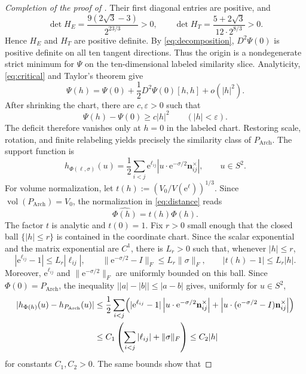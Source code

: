 \documentclass[11pt]{article}
\newcommand{\vol}{\operatorname{vol}}
\newcommand{\Arch}{P_{\mathrm{Arch}}}
\newcommand{\mb}[1]{\mathbf{#1}}
\newcommand{\e}{\mathrm e}
\theoremstyle{remark}
\begin{document}
\begin{proof}[Completion of the proof of ]
Their first diagonal entries are positive, and
\[
 \det H_E=\frac{9(2\sqrt3-3)}{2^{23/3}}>0,\qquad
 \det H_T=\frac{5+2\sqrt3}{12\cdot 2^{8/3}}>0.
\]
Hence $H_E$ and $H_T$ are positive definite.  By \eqref{eq:decomposition},
$D^2\Psi(0)$ is positive definite on all ten tangent directions.  Thus the
origin is a nondegenerate strict minimum for $\Psi$ on the ten-dimensional labeled
similarity slice.
Analyticity, \eqref{eq:critical} and Taylor's theorem give
\[
 \Psi(h)=\Psi(0)+\frac12D^2\Psi(0)[h,h]+o(|h|^2).
\]
After shrinking the chart, there are $c,\varepsilon>0$ such that
\begin{equation}\label{eq:chart-gap}
 \Psi(h)-\Psi(0)\geq c|h|^2
 \qquad(|h|<\varepsilon).
\end{equation}
The deficit therefore vanishes only at $h=0$ in the labeled chart.  Restoring scale, rotation, and finite relabeling yields precisely the similarity class of $\Arch$.
The support function is
\begin{equation}\label{eq:support}
 h_{\Phi(\ell,\sigma)}(u)=\frac12\sum_{i<j}\e^{\ell_{ij}}
 \left|u\cdot \e^{-\sigma/2}\mb n_{ij}^{\times}\right|,
 \qquad u\in S^2.
\end{equation}
For volume normalization, let
$t(h):=(V_0/V(\e^\ell))^{1/3}$.  Since $\vol(\Arch)=V_0$, the normalization in
\eqref{eq:distance} reads $$\widehat{\Phi(h)}=t(h)\Phi(h).$$
The factor $t$ is analytic and $t(0)=1$.  Fix $r>0$ small enough that
the closed ball $\{|h|\leq r\}$ is contained in the coordinate chart.
Since the scalar exponential and the matrix exponential
are $C^1$,
there is $L_r>0$ such that, whenever $|h|\leq r$,
\[
 |\e^{\ell_{ij}}-1|\leq L_r|\ell_{ij}|,\qquad
 \|\e^{-\sigma/2}-I\|_F\leq L_r\|\sigma\|_F,\qquad
 |t(h)-1|\leq L_r|h|.
\]
Moreover, $\e^{\ell_{ij}}$ and $\|\e^{-\sigma/2}\|_F$ are uniformly
bounded on this ball.  Since $\Phi(0)=\Arch$, the inequality
$\bigl||a|-|b|\bigr|\leq|a-b|$ gives, uniformly for $u\in S^2$,
\[
\begin{aligned}
 |h_{\Phi(h)}(u)-h_{\Arch}(u)|
 &\leq \frac12\sum_{i<j}
 \Bigl(
  |\e^{\ell_{ij}}-1|
  \left|u\cdot\e^{-\sigma/2}\mb n_{ij}^{\times}\right|
  +
  \left|u\cdot
  (\e^{-\sigma/2}-I)\mb n_{ij}^{\times}\right|
 \Bigr)                                                     \\
 &\leq C_1\left(\sum_{i<j}|\ell_{ij}|+\|\sigma\|_F\right)
 \leq C_2|h|
\end{aligned}
\]
for constants $C_1,C_2>0$.  The same bounds show that

\end{proof}
\end{document}
